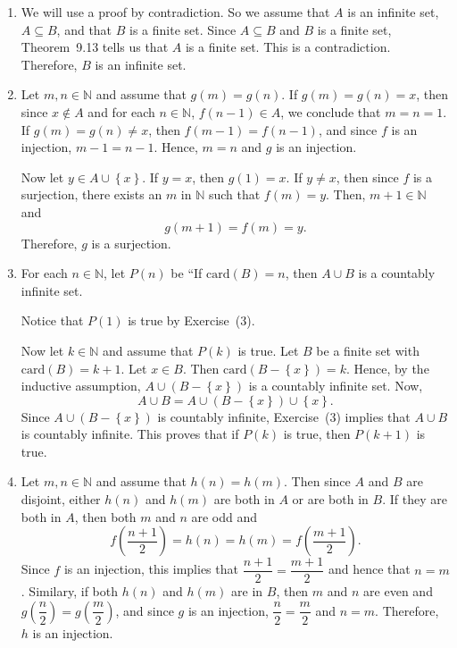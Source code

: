 \begin{enumerate}
\item We will use a proof by contradiction.  So we assume that $A$ is an infinite set, $A \subseteq B$, and that $B$ is a finite set.   Since $A \subseteq B$ and $B$ is a finite set, Theorem~9.13 tells us that $A$ is a finite set.  This is a contradiction.  Therefore, $B$ is an infinite set.




\item Let $m, n \in \mathbb{N}$ and assume that $g \left( m \right) = g \left( n \right)$.  If 
$g \left( m \right) = g \left( n \right) = x$, then since $x \notin A$ and for each 
$n \in \mathbb{N}$, $f \left( n - 1 \right) \in A$, we conclude that $m = n = 1$.  If 
$g \left( m \right) = g \left( n \right) \ne x$, then 
$f \left( m - 1 \right) = f \left( n - 1 \right)$, and since $f$ is an injection, $m - 1 = n - 1$.  Hence, $m = n$ and $g$ is an injection.

Now let $y \in A \cup \left\{ x \right\}$.  If $y = x $, then $g \left( 1 \right) = x$.  If 
$y \ne x$, then since $f$ is a surjection, there exists an $m$ in $\mathbb{N}$ such that 
$f \left( m \right) = y$.  Then, $m + 1 \in \mathbb{N}$ and
\[
g \left( m + 1 \right) = f \left( m \right) = y.
\]
Therefore, $g$ is a surjection.

\item For each $n \in \mathbb{N}$, let $P \left( n \right)$ be ``If 
$\text{card} \left( B \right) = n$, then $A \cup B$ is a countably infinite set.

Notice that $P \left( 1 \right)$ is true by Exercise~(3).

Now let $k \in \mathbb{N}$ and assume that $P \left( k \right)$ is true.  Let $B$ be a finite set with $\text{card} \left( B \right) = k + 1$.  Let $x \in B$.  Then 
$\text{card} \left( B - \left\{ x \right\} \right) = k$.  Hence, by the inductive assumption, 
$A \cup \left( B - \left\{ x \right\} \right)$ is a countably infinite set.  Now,
\[
A \cup B = A \cup \left( B - \left\{ x \right\} \right) \cup \left\{ x \right\}.
\]
Since $A \cup \left( B - \left\{ x \right\} \right)$ is countably infinite, Exercise~(3) implies that $A \cup B$ is countably infinite.  This proves that if $P \left( k \right)$ is true, then 
$P \left( k + 1 \right)$ is true.

\item Let $m, n \in \mathbb{N}$ and assume that $h \left( n \right) = h \left( m \right)$. Then since $A$ and $B$ are disjoint, either $h \left( n \right)$ and $h \left( m \right)$ are both in $A$ or are both in $B$.  If they are both in $A$, then both $m$ and $n$ are odd and
\[
f \left( \frac{n + 1}{2} \right) = h \left( n \right) = h \left( m \right) = f \left( \frac{m + 1}{2} \right).
\]
Since $f$ is an injection, this implies that $\dfrac{n + 1}{2} = \dfrac{m + 1}{2}$ and hence that $n = m$.  Similary, if both $h \left( n \right)$ and $h \left( m \right)$ are in $B$, then $m$ and $n$ are even and $g \left( \dfrac{n}{2} \right) = g \left( \dfrac{m}{2} \right)$, and since $g$ is an injection, $\dfrac{n}{2} = \dfrac{m}{2}$ and $n = m$.  Therefore, $h$ is an injection.


\end{enumerate}
